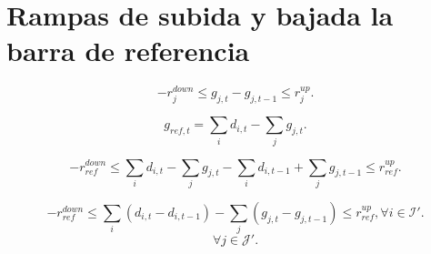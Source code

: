 \section{Rampas de subida y bajada la barra de referencia}

\begin{equation*}
-r^{down}_j \le g_{j,t} - g_{j,t-1} \le r^{up}_{j}.
\end{equation*}

\begin{equation*}
g_{ref,t} = \sum_{i}d_{i,t} - \sum_{j}g_{j,t}.
\end{equation*}

\begin{equation*}
-r^{down}_{ref} \le \sum_{i}d_{i,t} - \sum_{j}g_{j,t} - \sum_{i}d_{i,t-1} + \sum_{j}g_{j,t-1} \le r^{up}_{ref}.
\end{equation*}

\begin{equation}
-r^{down}_{ref} \le \sum_{i}(d_{i,t} - d_{i,t-1}) - \sum_{j}(g_{j,t} - g_{j,t-1}) \le r^{up}_{ref}, \forall i \in \mathcal{I}'.
\end{equation}
\begin{equation*}
    \forall j \in \mathcal{J}'.
\end{equation*}